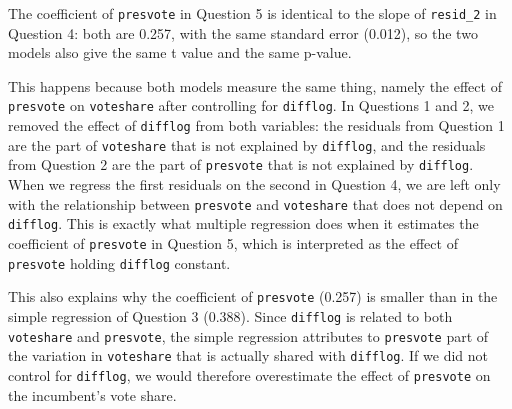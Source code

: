 \documentclass[12pt,letterpaper]{article}
\begin{document}
\begin{enumerate}
		\noindent The coefficient of \texttt{presvote} in Question 5 is identical to the slope of \texttt{resid\_2} in Question 4: both are 0.257, with the same standard error (0.012), so the two models also give the same t value and the same p-value.
		
		\noindent This happens because both models measure the same thing, namely the effect of \texttt{presvote} on \texttt{voteshare} after controlling for \texttt{difflog}. In Questions 1 and 2, we removed the effect of \texttt{difflog} from both variables: the residuals from Question 1 are the part of \texttt{voteshare} that is not explained by \texttt{difflog}, and the residuals from Question 2 are the part of \texttt{presvote} that is not explained by \texttt{difflog}. When we regress the first residuals on the second in Question 4, we are left only with the relationship between \texttt{presvote} and \texttt{voteshare} that does not depend on \texttt{difflog}. This is exactly what multiple regression does when it estimates the coefficient of \texttt{presvote} in Question 5, which is interpreted as the effect of \texttt{presvote} holding \texttt{difflog} constant.
		
		\noindent This also explains why the coefficient of \texttt{presvote} (0.257) is smaller than in the simple regression of Question 3 (0.388). Since \texttt{difflog} is related to both \texttt{voteshare} and \texttt{presvote}, the simple regression attributes to \texttt{presvote} part of the variation in \texttt{voteshare} that is actually shared with \texttt{difflog}. If we did not control for \texttt{difflog}, we would therefore overestimate the effect of \texttt{presvote} on the incumbent's vote share.
	\end{enumerate}
	
\end{document}
